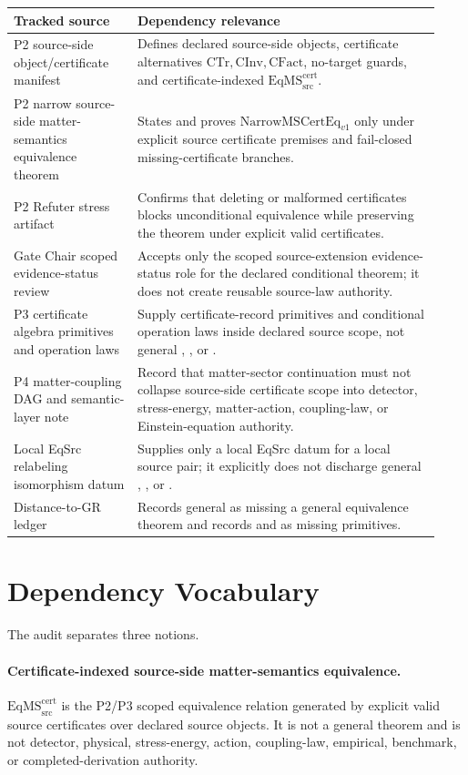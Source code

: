 \documentclass[11pt]{article}
\newcommand{\EqSrc}{\mathrm{EqSrc}}
\newcommand{\RetainH}{\mathrm{RetainH}}
\newcommand{\GenH}{\mathrm{GenH}}
\newcommand{\EqMScert}{\mathrm{EqMS}^{\mathrm{cert}}_{\mathrm{src}}}
\newcommand{\CTr}{\mathrm{CTr}}
\newcommand{\CInv}{\mathrm{CInv}}
\newcommand{\CFact}{\mathrm{CFact}}
\newcommand{\NarrowMSCertEq}{\mathrm{NarrowMSCertEq}_{v1}}
\begin{document}
\begin{longtable}{p{0.27\linewidth}p{0.66\linewidth}}
\textbf{Tracked source} & \textbf{Dependency relevance} \\
\hline
P2 source-side object/certificate manifest &
Defines declared source-side objects, certificate alternatives
\(\CTr,\CInv,\CFact\), no-target guards, and certificate-indexed
\(\EqMScert\). \\
P2 narrow source-side matter-semantics equivalence theorem &
States and proves \(\NarrowMSCertEq\) only under explicit source certificate
premises and fail-closed missing-certificate branches. \\
P2 Refuter stress artifact &
Confirms that deleting or malformed certificates blocks unconditional
equivalence while preserving the theorem under explicit valid certificates. \\
Gate Chair scoped evidence-status review &
Accepts only the scoped source-extension evidence-status role for the declared
conditional theorem; it does not create reusable source-law authority. \\
P3 certificate algebra primitives and operation laws &
Supply certificate-record primitives and conditional operation laws inside
declared source scope, not general \EqSrc, \RetainH, or \GenH. \\
P4 matter-coupling DAG and semantic-layer note &
Record that matter-sector continuation must not collapse source-side
certificate scope into detector, stress-energy, matter-action, coupling-law,
or Einstein-equation authority. \\
Local EqSrc relabeling isomorphism datum &
Supplies only a local EqSrc datum for a local source pair; it explicitly does
not discharge general \EqSrc, \RetainH, or \GenH. \\
Distance-to-GR ledger &
Records general \EqSrc as missing a general equivalence theorem and records
\RetainH and \GenH as missing primitives. \\
\end{longtable}

\section*{Dependency Vocabulary}

The audit separates three notions.

\paragraph{Certificate-indexed source-side matter-semantics equivalence.}
\(\EqMScert\) is the P2/P3 scoped equivalence relation generated by explicit
valid source certificates over declared source objects. It is not a general
\EqSrc theorem and is not detector, physical, stress-energy, action,
coupling-law, empirical, benchmark, or completed-derivation authority.
\end{document}
